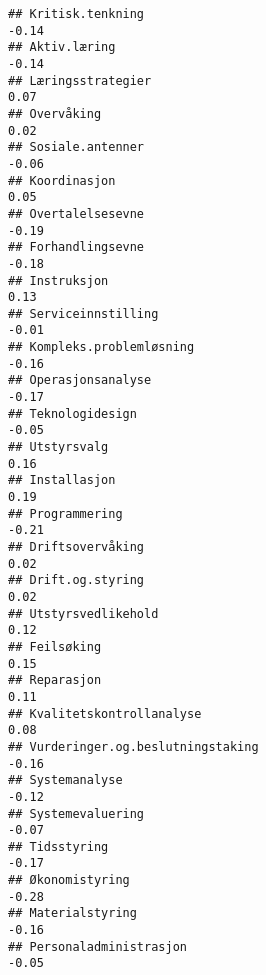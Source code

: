 \documentclass[
]{article}
\begin{document}
\begin{verbatim}
## Kritisk.tenkning                                                                 -0.14
## Aktiv.læring                                                                     -0.14
## Læringsstrategier                                                                 0.07
## Overvåking                                                                        0.02
## Sosiale.antenner                                                                 -0.06
## Koordinasjon                                                                      0.05
## Overtalelsesevne                                                                 -0.19
## Forhandlingsevne                                                                 -0.18
## Instruksjon                                                                       0.13
## Serviceinnstilling                                                               -0.01
## Kompleks.problemløsning                                                          -0.16
## Operasjonsanalyse                                                                -0.17
## Teknologidesign                                                                  -0.05
## Utstyrsvalg                                                                       0.16
## Installasjon                                                                      0.19
## Programmering                                                                    -0.21
## Driftsovervåking                                                                  0.02
## Drift.og.styring                                                                  0.02
## Utstyrsvedlikehold                                                                0.12
## Feilsøking                                                                        0.15
## Reparasjon                                                                        0.11
## Kvalitetskontrollanalyse                                                          0.08
## Vurderinger.og.beslutningstaking                                                 -0.16
## Systemanalyse                                                                    -0.12
## Systemevaluering                                                                 -0.07
## Tidsstyring                                                                      -0.17
## Økonomistyring                                                                   -0.28
## Materialstyring                                                                  -0.16
## Personaladministrasjon                                                           -0.05

\end{verbatim}
\end{document}
